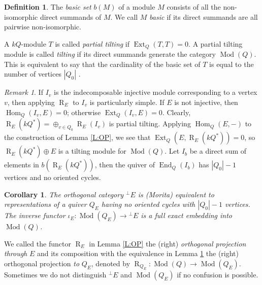 \documentclass{amsart}
\newtheorem{corollary}[theorem]{Corollary}
\theoremstyle{definition}
\newtheorem{definition}[theorem]{Definition}
\theoremstyle{remark}
\newtheorem{remark}[theorem]{Remark}
\numberwithin{equation}{section}
\begin{document}
\begin{definition} The {\em basic set} $b(M)$ of a module $M$ consists of all the non-isomorphic direct summands of $M$. We call $M$ {\em basic} if its direct summands are all pairwise non-isomorphic.

A $kQ$-module $T$ is called {\em partial tilting} if ${\operatorname{Ext}}_Q(T,T)=0$. A partial tilting module is called {\em tilting} if its direct summands generate the category ${\operatorname{Mod}}(Q)$. This is equivalent to say that the cardinality of the basic set of $T$ is equal to the number of vertices $|Q_0|$ \cite[Proposition VI.4.4]{ASS}.
\end{definition}

\begin{remark} \label{R:proj} If $I_v$ is the indecomposable injective module corresponding to a vertex $v$, then
applying ${\operatorname{R}}_E$ to $I_v$ is particularly simple. If $E$ is not injective, then ${\operatorname{Hom}}_Q(I_v,E)=0$; otherwise ${\operatorname{Ext}}_Q(I_v,E)=0$.
Clearly, ${\operatorname{R}}_E(kQ^*)=\oplus_{v\in Q_0}{\operatorname{R}}_E(I_v)$ is partial tilting. Applying ${\operatorname{Hom}}_Q(E,-)$ to the construction of Lemma \ref{L:OP}, we see that ${\operatorname{Ext}}_Q(E,{\operatorname{R}}_E(kQ^*))=0$, so ${\operatorname{R}}_E(kQ^*)\oplus E$ is a tilting module for ${\operatorname{Mod}}(Q)$. Let $I_b$ be a direct sum of elements in $b({\operatorname{R}}_E(kQ^*))$, then the quiver of ${\operatorname{End}}_Q(I_b)$ has $|Q_0|-1$ vertices and no oriented cycles.
\end{remark}

\begin{corollary} \cite[Theorem 2.3]{S1} \label{C:OC}
The orthogonal category ${{^\perp}\!} E$ is (Morita) equivalent to representations of a quiver $Q_E$ having no oriented cycles with $|Q_0|-1$ vertices. The inverse functor $\iota_E: {\operatorname{Mod}}(Q_E)\to{{^\perp}\!} E$ is a full exact embedding into ${\operatorname{Mod}}(Q)$.
\end{corollary}

We called the functor ${\operatorname{R}}_E$ in Lemma \ref{L:OP} the (right) {\em orthogonal projection through} $E$ and its composition with the equivalence in Lemma \ref{C:OC} the (right) orthogonal projection {\em to} $Q_E$, denoted by ${\operatorname{R}}_{Q_E}:{\operatorname{Mod}}(Q)\to{\operatorname{Mod}}(Q_E)$. Sometimes we do not distinguish ${{^\perp}\!} E$ and ${\operatorname{Mod}}(Q_E)$ if no confusion is possible.
\end{document}
